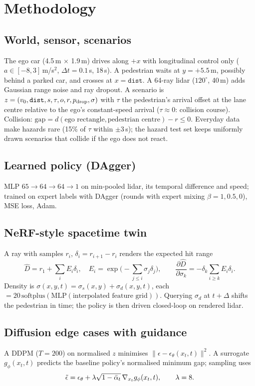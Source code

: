 \section{Methodology}
\subsection{World, sensor, scenarios}
The ego car (4.5\,m $\times$ 1.9\,m) drives along $+x$ with longitudinal control only ($a\in[-8,3]$\,m/s$^2$, $\Delta t=0.1$\,s, 18\,s). A pedestrian waits at $y=+5.5$\,m, possibly behind a parked car, and crosses at $x=\texttt{dist}$. A 64-ray lidar ($120^\circ$, 40\,m) adds Gaussian range noise and ray dropout. A scenario is $z=(v_0,\texttt{dist},s,\tau,o,r,p_{\rm drop},\sigma)$ with $\tau$ the pedestrian's arrival offset at the lane centre relative to the ego's constant-speed arrival ($\tau\approx0$: collision course). Collision: $\mathrm{gap}=d(\text{ego rectangle},\text{pedestrian centre})-r\le 0$. Everyday data make hazards rare (15\% of $\tau$ within $\pm3$\,s); the hazard test set keeps uniformly drawn scenarios that collide if the ego does not react.

\subsection{Learned policy (DAgger)}
MLP $65\!\to\!64\!\to\!64\!\to\!1$ on min-pooled lidar, its temporal difference and speed; trained on expert labels with DAgger (rounds with expert mixing $\beta=1,0.5,0$), MSE loss, Adam.

\subsection{NeRF-style spacetime twin}
A ray with samples $r_i$, $\delta_i=r_{i+1}-r_i$ renders the expected hit range
\begin{equation}\hat D=r_1+\sum_{i}E_i\delta_i,\quad E_i=\exp\Big(-\sum_{j\le i}\sigma_j\delta_j\Big),\qquad \frac{\partial\hat D}{\partial\sigma_k}=-\delta_k\sum_{i\ge k}E_i\delta_i .\end{equation}
Density is $\sigma(x,y,t)=\sigma_s(x,y)+\sigma_d(x,y,t)$, each $=20\,\mathrm{softplus}(\mathrm{MLP}(\text{interpolated feature grid}))$. Querying $\sigma_d$ at $t+\Delta$ shifts the pedestrian in time; the policy is then driven closed-loop on rendered lidar.

\subsection{Diffusion edge cases with guidance}
A DDPM ($T{=}200$) on normalised $z$ minimises $\|\epsilon-\epsilon_\theta(x_t,t)\|^2$. A surrogate $g_\phi(x_t,t)$ predicts the baseline policy's normalised minimum gap; sampling uses
\begin{equation}\tilde\epsilon=\epsilon_\theta+\lambda\sqrt{1-\bar\alpha_t}\,\nabla_{x_t}g_\phi(x_t,t),\qquad \lambda=8 .\end{equation}

